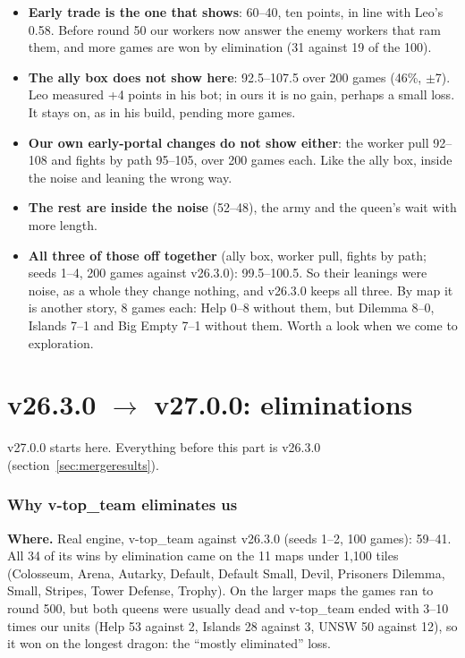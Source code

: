 \documentclass[11pt,a4paper]{article}
\begin{document}
\begin{itemize}
  \item \textbf{Early trade is the one that shows}: 60--40, ten points, in line with Leo's 0.58. Before round 50 our
        workers now answer the enemy workers that ram them, and more games are won by elimination (31 against 19 of the
        100).
  \item \textbf{The ally box does not show here}: 92.5--107.5 over 200 games (46\%, $\pm$7). Leo measured +4 points in
        his bot; in ours it is no gain, perhaps a small loss. It stays on, as in his build, pending more games.
  \item \textbf{Our own early-portal changes do not show either}: the worker pull 92--108 and fights by path 95--105, over
        200 games each. Like the ally box, inside the noise and leaning the wrong way.
  \item \textbf{The rest are inside the noise} (52--48), the army and the queen's wait with more length.
  \item \textbf{All three of those off together} (ally box, worker pull, fights by path; seeds 1--4, 200 games against
        v26.3.0): 99.5--100.5. So their leanings were noise, as a whole they change nothing, and v26.3.0 keeps all three.
        By map it is another story, 8 games each: Help 0--8 without them, but Dilemma 8--0, Islands 7--1 and Big Empty
        7--1 without them. Worth a look when we come to exploration.
\end{itemize}


\part{v26.3.0 $\rightarrow$ v27.0.0: eliminations}
v27.0.0 starts here. Everything before this part is v26.3.0 (section~\ref{sec:mergeresults}).

\section{Why v-top\_team eliminates us}\label{sec:whyelim}
\textbf{Where.} Real engine, v-top\_team against v26.3.0 (seeds 1--2, 100 games): 59--41. All 34 of its wins by elimination
came on the 11 maps under 1,100 tiles (Colosseum, Arena, Autarky, Default, Default Small, Devil, Prisoners Dilemma, Small,
Stripes, Tower Defense, Trophy). On the larger maps the games ran to round 500, but both queens were usually dead and
v-top\_team ended with 3--10 times our units (Help 53 against 2, Islands 28 against 3, UNSW 50 against 12), so it won on
the longest dragon: the ``mostly eliminated'' loss.
\end{document}
